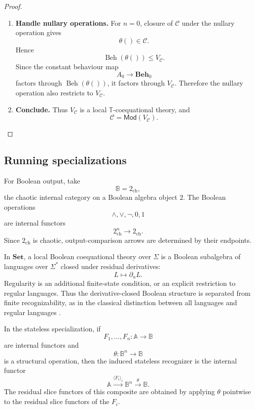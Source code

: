 \begin{proof}
\begin{enumerate}
        \item \textbf{Handle nullary operations.}
        For \(n=0\), closure of \(\mathcal C\) under the nullary operation
        gives
        \[
            \theta()\in\mathcal C.
        \]
        Hence
        \[
            \operatorname{Beh}(\theta())\leq V_{\mathcal C}.
        \]
        Since the constant behaviour map
        \[
            A_0\to\mathbf{Beh}_0
        \]
        factors through \(\operatorname{Beh}(\theta())\), it factors through
        \(V_{\mathcal C}\). Therefore the nullary operation also restricts to
        \(V_{\mathcal C}\).

        \item \textbf{Conclude.}
        Thus \(V_{\mathcal C}\) is a local \(\mathbb T\)-coequational theory,
        and
        \[
            \mathcal C=\mathsf{Mod}(V_{\mathcal C}).
        \]
    \end{enumerate}
\end{proof}

\subsection{Running specializations}
\label{subsec:structured-output-running-specializations}

For Boolean output, take
\[
    \mathbb B=2_{\mathrm{ch}},
\]
the chaotic internal category on a Boolean algebra object \(2\). The Boolean
operations
\[
    \wedge,\vee,\neg,0,1
\]
are internal functors
\[
    2_{\mathrm{ch}}^n\to 2_{\mathrm{ch}}.
\]
Since \(2_{\mathrm{ch}}\) is chaotic, output-comparison arrows are determined
by their endpoints.

In \(\mathbf{Set}\), a local Boolean coequational theory over \(\Sigma\) is a
Boolean subalgebra of languages over \(\Sigma^*\) closed under residual
derivatives:
\[
    L\longmapsto \partial_uL.
\]
Regularity is an additional finite-state condition, or an explicit restriction
to regular languages. Thus the derivative-closed Boolean structure is separated
from finite recognizability, as in the classical distinction between all
languages and regular languages
\cite{Eilenberg1974,HopcroftMotwaniUllman2006,Brzozowski1964}.

In the stateless specialization, if
\[
    F_1,\dots,F_n:\mathbb A\to\mathbb B
\]
are internal functors and
\[
    \theta:\mathbb B^n\to\mathbb B
\]
is a structural operation, then the induced stateless recognizer is the
internal functor
\[
    \mathbb A
    \xrightarrow{\langle F_i\rangle_i}
    \mathbb B^n
    \xrightarrow{\theta}
    \mathbb B.
\]
The residual slice functors of this composite are obtained by applying
\(\theta\) pointwise to the residual slice functors of the \(F_i\).

